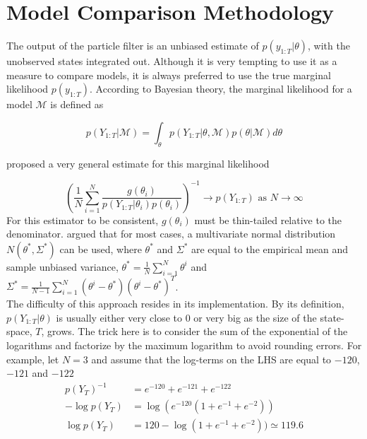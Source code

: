 \documentclass[11pt,a4,twosided,singlespacing,titlepagenumber=on]{scrreprt}
\numberwithin{equation}{chapter} %
\theoremstyle{remark}
\begin{document}
% 

\section{Model Comparison Methodology}
The output of the particle filter is an unbiased estimate of $p(y_{1:T}|\theta)$, with the unobserved states integrated out. Although it is very tempting to use it as a measure to compare models, it is always preferred to use the true marginal likelihood $p(y_{1:T})$. According to Bayesian theory, the marginal likelihood for a model $\mathcal{M}$ is defined as

\begin{equation}
p(Y_{1:T} | \mathcal{M}) = \int_{\theta} p(Y_{1:T} | \theta, \mathcal{M}) p(\theta | \mathcal{M}) d\theta
\end{equation}


\cite{gelfand1994} proposed a very general estimate for this marginal likelihood

\begin{equation}
\left(\frac{1}{N} \sum_{i=1}^N \frac{g(\theta_i)}{p(Y_{1:T} | \theta_i) p(\theta_i)}\right)^{-1} \rightarrow p(Y_{1:T}) \text{ as } N \rightarrow \infty
\end{equation}
For this estimator to be consistent, $g(\theta_i)$ must be thin-tailed relative to the denominator. \cite{gelfand1994} argued that for most cases, a multivariate normal distribution $N(\theta^*, \Sigma^*)$ can be used, where $\theta^*$ and $\Sigma^*$ are equal to the empirical mean and sample unbiased variance, $\theta^* = \frac{1}{N} \sum_{i=1}^N \theta^i$ and $\Sigma^* = \frac{1}{N-1} \sum_{i=1}^N \left(\theta^i - \theta^*\right)\left(\theta^i - \theta^*\right)^T$. \\


The difficulty of this approach resides in its implementation. By its definition, $p(Y_{1:T} | \theta)$ is usually either very close to 0 or very big as the size of the state-space, $T$, grows. The trick here is to consider the sum of the exponential of the logarithms and factorize by the maximum logarithm to avoid rounding errors. For example, let $N = 3$ and assume that the log-terms on the LHS are equal to $-120$, $-121$ and $-122$
\begin{align*}
p(Y_T)^{-1} &= e^{-120} + e^{-121} + e^{-122} \\
- \log p(Y_T) &= \log (e^{-120} ( 1 + e^{-1} + e^{-2})) \\
 \log p(Y_T) &= 120 - \log ( 1 + e^{-1} + e^{-2})) \simeq 119.6
\end{align*}
\end{document}
